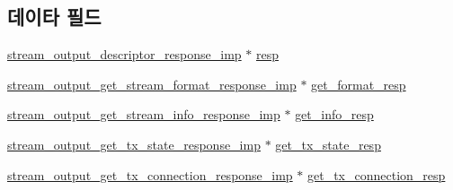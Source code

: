 \subsection*{데이타 필드}
\begin{DoxyCompactItemize}
\item 
\hyperlink{classavdecc__lib_1_1stream__output__descriptor__response__imp}{stream\+\_\+output\+\_\+descriptor\+\_\+response\+\_\+imp} $\ast$ \hyperlink{classavdecc__lib_1_1stream__output__descriptor__imp_a48592b631f05337146bcc262acfa95c9}{resp}
\item 
\hyperlink{classavdecc__lib_1_1stream__output__get__stream__format__response__imp}{stream\+\_\+output\+\_\+get\+\_\+stream\+\_\+format\+\_\+response\+\_\+imp} $\ast$ \hyperlink{classavdecc__lib_1_1stream__output__descriptor__imp_abead806bc6aa5a300c8fddb37d032aa7}{get\+\_\+format\+\_\+resp}
\item 
\hyperlink{classavdecc__lib_1_1stream__output__get__stream__info__response__imp}{stream\+\_\+output\+\_\+get\+\_\+stream\+\_\+info\+\_\+response\+\_\+imp} $\ast$ \hyperlink{classavdecc__lib_1_1stream__output__descriptor__imp_a244eccf322cb5342cbe531e99fb54842}{get\+\_\+info\+\_\+resp}
\item 
\hyperlink{classavdecc__lib_1_1stream__output__get__tx__state__response__imp}{stream\+\_\+output\+\_\+get\+\_\+tx\+\_\+state\+\_\+response\+\_\+imp} $\ast$ \hyperlink{classavdecc__lib_1_1stream__output__descriptor__imp_a7ed2c3b980a4d1c9981cb46190e8db9e}{get\+\_\+tx\+\_\+state\+\_\+resp}
\item 
\hyperlink{classavdecc__lib_1_1stream__output__get__tx__connection__response__imp}{stream\+\_\+output\+\_\+get\+\_\+tx\+\_\+connection\+\_\+response\+\_\+imp} $\ast$ \hyperlink{classavdecc__lib_1_1stream__output__descriptor__imp_a473ecad2862f8c07039b0986ebec35e1}{get\+\_\+tx\+\_\+connection\+\_\+resp}
\end{DoxyCompactItemize}
